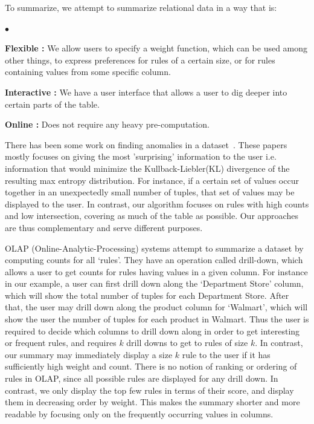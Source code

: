 \documentclass{sig-alternate}
\newcommand{\squishlist}{
   \begin{list}{$\bullet$}
    { \setlength{\itemsep}{0pt}
      \setlength{\parsep}{2pt}
      \setlength{\topsep}{2pt}
      \setlength{\partopsep}{0pt}
    }
}
\newcommand{\squishend}{\end{list}}
\begin{document}
To summarize, we attempt to summarize relational data in a way that is:
\squishlist
\item \textbf{Flexible : } We allow users to specify a weight function, which can be used among other things, to express preferences for rules of a certain size, or for rules containing values from some specific column.
\item \textbf{Interactive : } We have a user interface that allows a user to dig deeper into certain parts of the table.
\item \textbf{Online : } Does not require any heavy pre-computation. 
\squishend

There has been some work on finding anomalies in a dataset~\cite{Sarawagi:2001:UMA:767141.767148, Sarawagi00user-adaptiveexploration, Sarawagi98discovery-drivenexploration, DBLP:journals/pvldb/GebalyAGKS14}. These papers mostly focuses on giving the most 'surprising' information to the user i.e. information that would minimize the Kullback-Liebler(KL) divergence of the resulting max entropy distribution. For instance, if a certain set of values occur together in an unexpectedly small number of tuples, that set of values may be displayed to the user. In contrast, our algorithm focuses on rules with high counts and low intersection, covering as much of the table as possible. Our approaches are thus complementary and serve different purposes.

OLAP (Online-Analytic-Processing) systems attempt to summarize a dataset by computing counts for all `rules'. They have an operation called drill-down, which allows a user to get counts for rules having values in a given column. For instance in our example, a user can first drill down along the `Department Store' column, which will show the total number of tuples for each Department Store. After that, the user may drill down along the product column for `Walmart', which will show the user the number of tuples for each product in Walmart. Thus the user is required to decide which columns to drill down along in order to get interesting or frequent rules, and requires $k$ drill downs to get to rules of size $k$. In contrast, our summary may immediately display a size $k$ rule to the user if it has sufficiently high weight and count. There is no notion of ranking or ordering of rules in OLAP, since all possible rules are displayed for any drill down. In contrast, we only display the top few rules in terms of their score, and display them in decreasing order by weight. This makes the summary shorter and more readable by focusing only on the frequently occurring values in columns.
\end{document}

